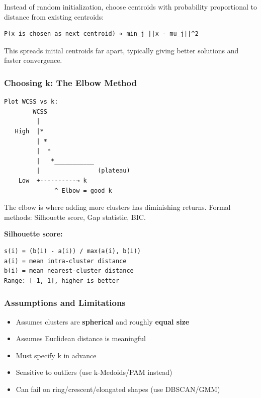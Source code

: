 \documentclass[11pt]{article}
\providecommand{\tightlist}{\setlength{\itemsep}{1pt}\setlength{\parskip}{0pt}}
\begin{document}
Instead of random initialization, choose centroids with probability proportional to distance from existing centroids:

\setcodelang{}

\begin{verbatim}
P(x is chosen as next centroid) ∝ min_j ||x - mu_j||^2
\end{verbatim}

This spreads initial centroids far apart, typically giving better solutions and faster convergence.

\subsubsection{Choosing k: The Elbow Method}\label{choosing-k-the-elbow-method}

\setcodelang{}

\begin{verbatim}
Plot WCSS vs k:
        WCSS
         |
   High  |*
         | *
         |  *
         |   *___________
         |                (plateau)
    Low  +----------→ k
              ^ Elbow = good k
\end{verbatim}

The elbow is where adding more clusters has diminishing returns. Formal methods: Silhouette score, Gap statistic, BIC.

\textbf{Silhouette score:}

\setcodelang{}

\begin{verbatim}
s(i) = (b(i) - a(i)) / max(a(i), b(i))
a(i) = mean intra-cluster distance
b(i) = mean nearest-cluster distance
Range: [-1, 1], higher is better
\end{verbatim}

\subsubsection{Assumptions and Limitations}\label{assumptions-and-limitations}

\begin{itemize}
\tightlist
\item
  Assumes clusters are \textbf{spherical} and roughly \textbf{equal size}
\item
  Assumes Euclidean distance is meaningful
\item
  Must specify k in advance
\item
  Sensitive to outliers (use k-Medoids/PAM instead)
\item
  Can fail on ring/crescent/elongated shapes (use DBSCAN/GMM)
\end{itemize}
\end{document}
